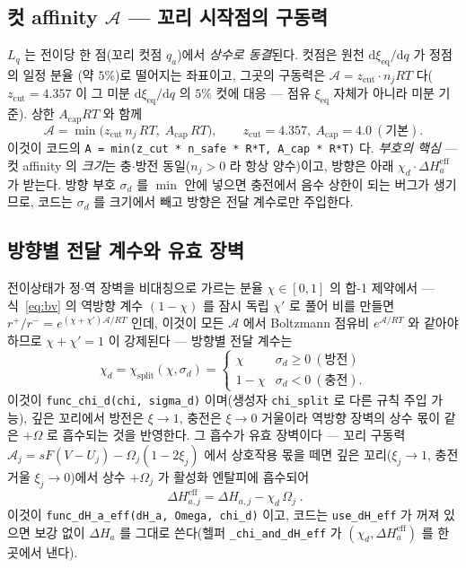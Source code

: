 \documentclass[11pt,a4paper]{article}
\newcommand{\dd}{\mathrm{d}}
\newcommand{\eff}{\mathrm{eff}}
\newcommand{\eq}{\mathrm{eq}}
\newcommand{\code}[1]{\texttt{#1}}
\begin{document}
\subsection{컷 affinity $\mathcal A$ — 꼬리 시작점의 구동력}
$L_q$ 는 전이당 한 점(꼬리 컷점 $q_a$)에서 \emph{상수로 동결}된다. 컷점은 원천 $\dd\xi_\eq/\dd q$ 가 정점의 일정 분율
(약 $5\%$)로 떨어지는 좌표이고, 그곳의 구동력은 $\mathcal A=z_\mathrm{cut}\cdot n_jRT$ 다($z_\mathrm{cut}=4.357$ 이
그 미분 $\dd\xi_\eq/\dd q$ 의 $5\%$ 컷에 대응 — 점유 $\xi_\eq$ 자체가 아니라 미분 기준). 상한 $A_\mathrm{cap}RT$ 와 함께
\begin{equation}
\mathcal A=\min\!\big(z_\mathrm{cut}\,n_j\,RT,\;A_\mathrm{cap}\,RT\big),
\qquad z_\mathrm{cut}=4.357,\ A_\mathrm{cap}=4.0\ (\text{기본}).
\label{eq:Acut}
\end{equation}
이것이 코드의 \code{A = min(z\_cut * n\_safe * R*T, A\_cap * R*T)} 다. \emph{부호의 핵심} — 컷 affinity 의 \emph{크기}는
충$\cdot$방전 동일($n_j>0$ 라 항상 양수)이고, 방향은 아래 $\chi_d\cdot\Delta H_a^\eff$ 가 받는다. 방향 부호 $\sigma_d$ 를
$\min$ 안에 넣으면 충전에서 음수 상한이 되는 버그가 생기므로, 코드는 $\sigma_d$ 를 크기에서 빼고 방향은 전달 계수로만
주입한다.

\subsection{방향별 전달 계수와 유효 장벽}
전이상태가 정$\cdot$역 장벽을 비대칭으로 가르는 분율 $\chi\in[0,1]$ 의 합-1 제약에서 — 식~\eqref{eq:bv} 의 역방향 계수
$(1-\chi)$ 를 잠시 독립 $\chi'$ 로 풀어 비를 만들면 $r^+/r^-=e^{(\chi+\chi')\mathcal A/RT}$ 인데, 이것이 모든 $\mathcal A$ 에서
Boltzmann 점유비 $e^{\mathcal A/RT}$ 와 같아야 하므로 $\chi+\chi'=1$ 이 강제된다 — 방향별 전달 계수는
\begin{equation}
\chi_d=\chi_\mathrm{split}(\chi,\sigma_d)=
\begin{cases}\chi & \sigma_d\ge0\ (\text{방전})\\ 1-\chi & \sigma_d<0\ (\text{충전}).\end{cases}
\label{eq:chid}
\end{equation}
이것이 \code{func\_chi\_d(chi, sigma\_d)} 이며(생성자 \code{chi\_split} 로 다른 규칙 주입 가능), 깊은 꼬리에서 방전은
$\xi\to1$, 충전은 $\xi\to0$ 거울이라 역방향 장벽의 상수 몫이 같은 $+\Omega$ 로 흡수되는 것을 반영한다. 그 흡수가 유효
장벽이다 — 꼬리 구동력 $\mathcal A_j=sF(V-U_j)-\Omega_j(1-2\xi_j)$ 에서 상호작용 몫을 떼면 깊은 꼬리($\xi_j\to1$,
충전 거울 $\xi_j\to0$)에서 상수 $+\Omega_j$ 가 활성화 엔탈피에 흡수되어
\begin{equation}
\boxed{\;\Delta H_{a,j}^\eff=\Delta H_{a,j}-\chi_d\,\Omega_j\;.}
\label{eq:dHeff}
\end{equation}
이것이 \code{func\_dH\_a\_eff(dH\_a, Omega, chi\_d)} 이고, 코드는 \code{use\_dH\_eff} 가 꺼져 있으면 보강 없이
$\Delta H_a$ 를 그대로 쓴다(헬퍼 \code{\_chi\_and\_dH\_eff} 가 $(\chi_d,\Delta H_a^\eff)$ 를 한 곳에서 낸다).
\end{document}

